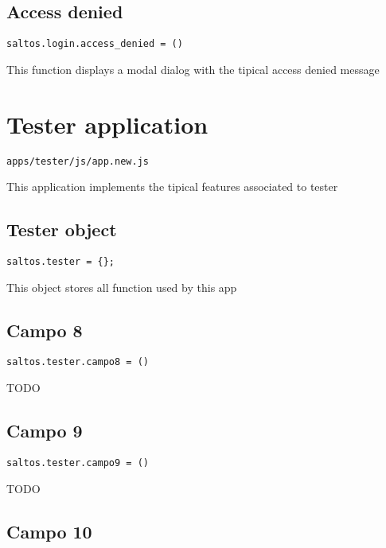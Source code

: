 \documentclass[a4paper]{book}
\begin{document}
\hypertarget{toc92}{}
\subsection{Access denied}

\begin{lstlisting}
saltos.login.access_denied = ()
\end{lstlisting}

This function displays a modal dialog with the tipical access denied message

\hypertarget{toc93}{}
\section{Tester application}

\begin{lstlisting}
apps/tester/js/app.new.js
\end{lstlisting}

This application implements the tipical features associated to tester

\hypertarget{toc94}{}
\subsection{Tester object}

\begin{lstlisting}
saltos.tester = {};
\end{lstlisting}

This object stores all function used by this app

\hypertarget{toc95}{}
\subsection{Campo 8}

\begin{lstlisting}
saltos.tester.campo8 = ()
\end{lstlisting}

TODO

\hypertarget{toc96}{}
\subsection{Campo 9}

\begin{lstlisting}
saltos.tester.campo9 = ()
\end{lstlisting}

TODO

\hypertarget{toc97}{}
\subsection{Campo 10}
\end{document}
